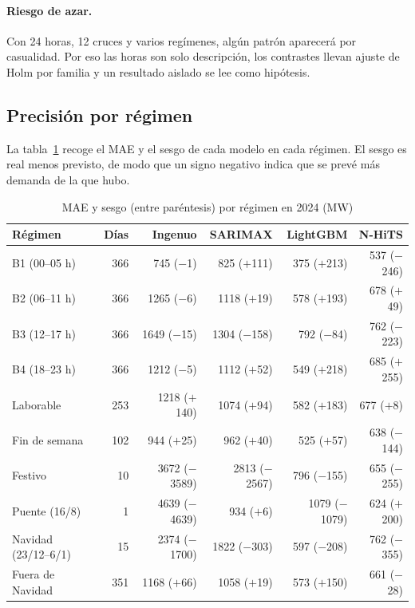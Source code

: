 \paragraph{Riesgo de azar.} Con 24 horas, 12 cruces y varios regímenes, algún
patrón aparecerá por casualidad. Por eso las horas son solo descripción, los
contrastes llevan ajuste de Holm por familia y un resultado aislado se lee como
hipótesis.

\subsection{Precisión por régimen}\label{sec:desg-precision}

La tabla~\ref{tab:desg-precision} recoge el MAE y el sesgo de cada modelo en
cada régimen. El sesgo es real menos previsto, de modo que un signo negativo
indica que se prevé más demanda de la que hubo.

\begin{table}[htbp]
	\centering
	\caption{MAE y sesgo (entre paréntesis) por régimen en 2024 (MW)}
	\label{tab:desg-precision}
	\small
	\begin{tabular}{lrrrrr}
		\hline
		\textbf{Régimen} & \textbf{Días} & \textbf{Ingenuo} & \textbf{SARIMAX} & \textbf{LightGBM} & \textbf{N-HiTS} \\
		\hline
		B1 (00--05 h) & 366 & 745 ($-$1) & 825 ($+$111) & 375 ($+$213) & 537 ($-$246) \\
		B2 (06--11 h) & 366 & 1265 ($-$6) & 1118 ($+$19) & 578 ($+$193) & 678 ($+$49) \\
		B3 (12--17 h) & 366 & 1649 ($-$15) & 1304 ($-$158) & 792 ($-$84) & 762 ($-$223) \\
		B4 (18--23 h) & 366 & 1212 ($-$5) & 1112 ($+$52) & 549 ($+$218) & 685 ($+$255) \\
		\hline
		Laborable & 253 & 1218 ($+$140) & 1074 ($+$94) & 582 ($+$183) & 677 ($+$8) \\
		Fin de semana & 102 & 944 ($+$25) & 962 ($+$40) & 525 ($+$57) & 638 ($-$144) \\
		Festivo & 10 & 3672 ($-$3589) & 2813 ($-$2567) & 796 ($-$155) & 655 ($-$255) \\
		Puente (16/8) & 1 & 4639 ($-$4639) & 934 ($+$6) & 1079 ($-$1079) & 624 ($+$200) \\
		\hline
		Navidad (23/12--6/1) & 15 & 2374 ($-$1700) & 1822 ($-$303) & 597 ($-$208) & 762 ($-$355) \\
		Fuera de Navidad & 351 & 1168 ($+$66) & 1058 ($+$19) & 573 ($+$150) & 661 ($-$28) \\
		\hline
	\end{tabular}
\end{table}

